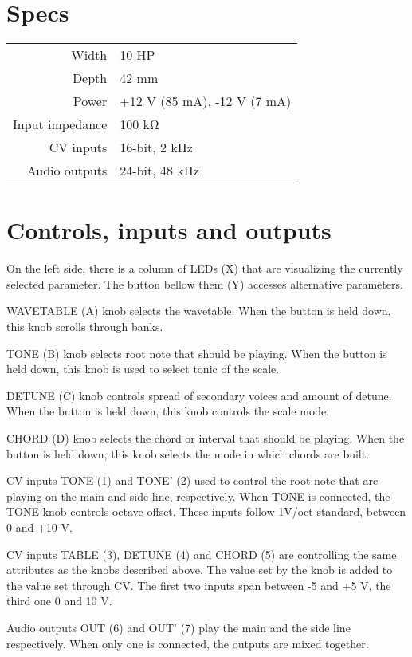 \documentclass[10pt,nofoldmark,nocombine]{leaflet} %
\begin{document}
\section{Specs}

\begin{tabular}{@{}rl@{}}
  Width & 10 HP \\
  Depth & 42 mm \\
  Power & +12 V (85 mA), -12 V (7 mA) \\
  Input impedance & 100 kΩ \\
  CV inputs & 16-bit, 2 kHz \\
  Audio outputs & 24-bit, 48 kHz
\end{tabular}

\section{Controls, inputs and outputs}

On the left side, there is a column of LEDs (X) that are visualizing the currently selected parameter. The button bellow them (Y) accesses alternative parameters.

WAVETABLE (A) knob selects the wavetable. When the button is held down, this knob scrolls through banks.

TONE (B) knob selects root note that should be playing. When the button is held down, this knob is used to select tonic of the scale.

DETUNE (C) knob controls spread of secondary voices and amount of detune. When the button is held down, this knob controls the scale mode.

CHORD (D) knob selects the chord or interval that should be playing. When the button is held down, this knob selects the mode in which chords are built.

CV inputs TONE (1) and TONE' (2) used to control the root note that are playing on the main and side line, respectively. When TONE is connected, the TONE knob controls octave offset. These inputs follow 1V/oct standard, between 0 and +10 V.

CV inputs TABLE (3), DETUNE (4) and CHORD (5) are controlling the same attributes as the knobs described above. The value set by the knob is added to the value set through CV. The first two inputs span between -5 and +5 V, the third one 0 and 10 V.

Audio outputs OUT (6) and OUT' (7) play the main and the side line respectively. When only one is connected,
the outputs are mixed together.
\end{document}
